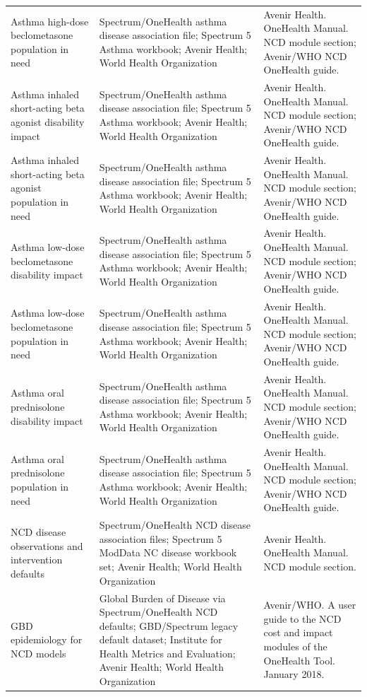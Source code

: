 \documentclass[11pt]{article}
\begin{document}
\begin{longtable}{@{}p{1.85in}p{2.25in}p{2.25in}@{}}
Asthma high-dose beclometasone population in need & Spectrum/OneHealth asthma disease association file; Spectrum 5 Asthma workbook; Avenir Health; World Health Organization & Avenir Health. OneHealth Manual. NCD module section; Avenir/WHO NCD OneHealth guide.\\
Asthma inhaled short-acting beta agonist disability impact & Spectrum/OneHealth asthma disease association file; Spectrum 5 Asthma workbook; Avenir Health; World Health Organization & Avenir Health. OneHealth Manual. NCD module section; Avenir/WHO NCD OneHealth guide.\\
Asthma inhaled short-acting beta agonist population in need & Spectrum/OneHealth asthma disease association file; Spectrum 5 Asthma workbook; Avenir Health; World Health Organization & Avenir Health. OneHealth Manual. NCD module section; Avenir/WHO NCD OneHealth guide.\\
Asthma low-dose beclometasone disability impact & Spectrum/OneHealth asthma disease association file; Spectrum 5 Asthma workbook; Avenir Health; World Health Organization & Avenir Health. OneHealth Manual. NCD module section; Avenir/WHO NCD OneHealth guide.\\
Asthma low-dose beclometasone population in need & Spectrum/OneHealth asthma disease association file; Spectrum 5 Asthma workbook; Avenir Health; World Health Organization & Avenir Health. OneHealth Manual. NCD module section; Avenir/WHO NCD OneHealth guide.\\
Asthma oral prednisolone disability impact & Spectrum/OneHealth asthma disease association file; Spectrum 5 Asthma workbook; Avenir Health; World Health Organization & Avenir Health. OneHealth Manual. NCD module section; Avenir/WHO NCD OneHealth guide.\\
Asthma oral prednisolone population in need & Spectrum/OneHealth asthma disease association file; Spectrum 5 Asthma workbook; Avenir Health; World Health Organization & Avenir Health. OneHealth Manual. NCD module section; Avenir/WHO NCD OneHealth guide.\\
NCD disease observations and intervention defaults & Spectrum/OneHealth NCD disease association files; Spectrum 5 ModData NC disease workbook set; Avenir Health; World Health Organization & Avenir Health. OneHealth Manual. NCD module section.\\
GBD epidemiology for NCD models & Global Burden of Disease via Spectrum/OneHealth NCD defaults; GBD/Spectrum legacy default dataset; Institute for Health Metrics and Evaluation; Avenir Health; World Health Organization & Avenir/WHO. A user guide to the NCD cost and impact modules of the OneHealth Tool. January 2018.\\

\end{longtable}
\end{document}
